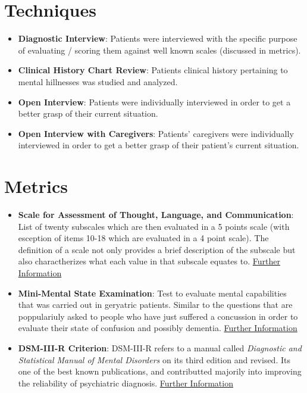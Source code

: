 \documentclass{Paper_Summary}
\begin{document}
\section{Techniques}
    \begin{itemize}
        \item \textbf{Diagnostic Interview}: Patients were interviewed with the specific purpose of evaluating / scoring them against well known scales (discussed in metrics).
        \item \textbf{Clinical History Chart Review}: Patients clinical history pertaining to mental hillnesses was studied and analyzed.
        \item \textbf{Open Interview}: Patients were individually interviewed in order to get a better grasp of their current situation.
        \item \textbf{Open Interview with Caregivers}: Patients' caregivers were individually interviewed in order to get a better grasp of their patient's current situation.
    \end{itemize}

\section{Metrics}
    \begin{itemize}
        \item \textbf{Scale for Assessment of Thought, Language, and Communication}: List of twenty subscales which are then evaluated in a 5 points scale (with esception of items 10-18 which are evaluated in a 4 point scale). The definition of a scale not only provides a brief description of the subscale but also charactherizes what each value in that subscale equates to. \href{https://www.northeastern.edu/cali/wp-content/uploads/2017/03/Scale-for-the-assessment-of-thought-language-and-communication.pdf}{Further Information} 
        \item \textbf{Mini-Mental State Examination}: Test to evaluate mental capabilities that was carried out in geryatric patients. Similar to the questions that are poppulariuly asked to people who have just suffered a concussion in order to evaluate their state of confusion and possibly dementia. \href{https://en.wikipedia.org/wiki/Mini%E2%80%93Mental_State_Examination}{Further Information} 
        \item \textbf{DSM-III-R Criterion}: DSM-III-R refers to a manual called \emph{Diagnostic and Statistical Manual of Mental Disorders} on its third edition and revised. Its one of the best known publications, and contributted majorily into improving the reliability of psychiatric diagnosis. \href{https://en.wikipedia.org/wiki/Diagnostic_and_Statistical_Manual_of_Mental_Disorders#DSM-III-R_(1987)}{Further Information}
    \end{itemize}
\end{document}
